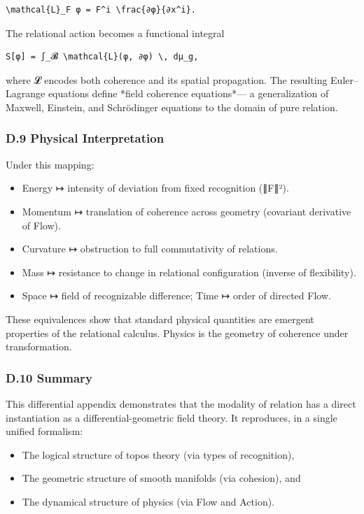 \documentclass[11pt]{article}
\begin{document}
\begin{verbatim}
\mathcal{L}_F φ = F^i \frac{∂φ}{∂x^i}.
\end{verbatim}

The relational action becomes a functional integral

\begin{verbatim}
S[φ] = ∫_𝓑 \mathcal{L}(φ, ∂φ) \, dμ_g,
\end{verbatim}

where 𝓛 encodes both coherence and its spatial propagation.  
The resulting Euler–Lagrange equations define *field coherence equations*—  
a generalization of Maxwell, Einstein, and Schrödinger equations  
to the domain of pure relation.
\subsubsection*{D.9 Physical Interpretation}
\label{sec:org4f79d15}
Under this mapping:
\begin{itemize}
\item Energy ↦ intensity of deviation from fixed recognition (∥F∥²).
\item Momentum ↦ translation of coherence across geometry (covariant derivative of Flow).
\item Curvature ↦ obstruction to full commutativity of relations.
\item Mass ↦ resistance to change in relational configuration (inverse of flexibility).
\item Space ↦ field of recognizable difference; Time ↦ order of directed Flow.
\end{itemize}

These equivalences show that standard physical quantities  
are emergent properties of the relational calculus.  
Physics is the geometry of coherence under transformation.
\subsubsection*{D.10 Summary}
\label{sec:org1dd79c5}
This differential appendix demonstrates that the modality of relation  
has a direct instantiation as a differential-geometric field theory.  
It reproduces, in a single unified formalism:
\begin{itemize}
\item The logical structure of topos theory (via types of recognition),
\item The geometric structure of smooth manifolds (via cohesion), and
\item The dynamical structure of physics (via Flow and Action).
\end{itemize}
\end{document}
